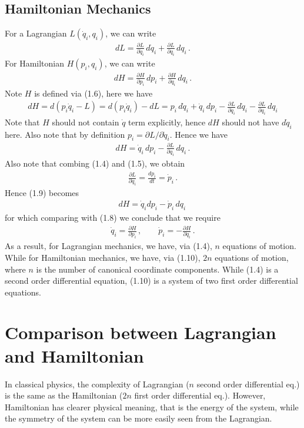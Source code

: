 \documentclass[11pt, onesided]{book}
\theoremstyle{break}
\theoremstyle{break}
\newcommand{\pd}{\partial}
\begin{document}
\subsection{Hamiltonian Mechanics}
For a Lagrangian $L(\dot{q}_i, q_i)$, we can write
\begin{align}
dL = \frac{\pd L}{\pd \dot{q}_i}\,d\dot{q}_i + \frac{\pd L}{\pd q_i}\,dq_i\,.
\end{align}
For Hamiltonian $H (p_i,q_i)$, we can write
\begin{align}
dH = \frac{\pd H}{\pd p_i}\, dp_i + \frac{\pd H}{\pd q_i}\, dq_i\,.
\end{align}
Note $H$ is defined via (1.6), here we have
\begin{align*}
dH = d(p_i \dot{q}_i -L) = d(p_i\dot{q}_i) - dL= p_i\, d\dot{q}_i +\dot{q}_i\, dp_i - \frac{\pd L}{\pd \dot{q}_i}\,d\dot{q}_i - \frac{\pd L}{\pd q_i}\,dq_i
\end{align*}
Note that $H$ should not contain $\dot{q}$ term explicitly, hence $dH$ should not have $d\dot{q}_i$ here. Also note that by definition $p_i = \pd L /\pd \dot{q}_i$. Hence we have
\begin{align}
dH =\dot{q}_i \,dp_i  - \frac{\pd L}{\pd q_i}\,dq_i\,.
\end{align}
Also note that combing (1.4) and (1.5), we obtain
\begin{align*}
\frac{\pd L}{\pd q_i} = \frac{dp_i}{dt} = \dot{p}_i\,.
\end{align*}
Hence (1.9) becomes
\begin{align*}
dH = \dot{q}_i dp_i - \dot{p}_i \, dq_i\,
\end{align*}
for which comparing with (1.8) we conclude that we require
\begin{align}
\dot{q}_i = \frac{\pd H}{\pd p_i}\,, \qquad
\dot{p}_i = -\frac{\pd H}{\pd q_i}\,.
\end{align}
As a result, for Lagrangian mechanics, we have, via (1.4), $n$ equations of motion. While for Hamiltonian mechanics, we have, via (1.10), $2n$ equations of motion, where $n$ is the number of canonical coordinate components. While (1.4) is a second order differential equation, (1.10) is a system of two first order differential equations.\\

\section[Comparison between Lagrangian and Hamiltonian]{\color{red}Comparison between Lagrangian and Hamiltonian\color{black}}
In classical physics, the complexity of Lagrangian ($n$ second order differential eq.) is the same as the Hamiltonian ($2n$ first order differential eq.). However, Hamiltonian has clearer physical meaning, that is the energy of the system, while the symmetry of the system can be more easily seen from the Lagrangian. \\
\end{document}
